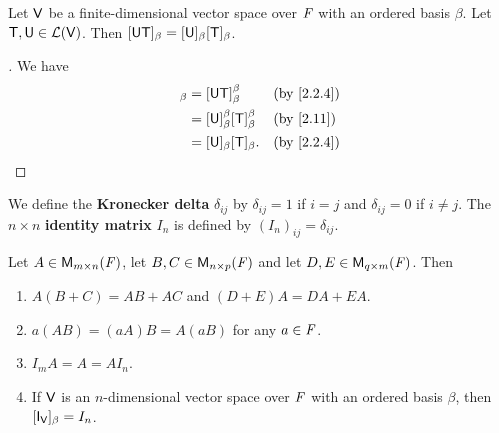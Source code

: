 \begin{cor}\label{2.3.3}
	Let \(\mathsf{V}\) be a finite-dimensional vector space over \(\mathit{F}\) with an ordered basis \(\beta\).
	Let \(\mathsf{T}, \mathsf{U} \in \mathcal{L}(\mathsf{V})\).
	Then \([\mathsf{U} \mathsf{T}]_{\beta} = [\mathsf{U}]_{\beta} [\mathsf{T}]_{\beta}\).
\end{cor}

\begin{proof}[]
	We have
	\begin{align*}
		[\U \T]_{\beta} & = [\U \T]_{\beta}^{\beta}                   &  & \by{2.2.4} \\
		                & = [\U]_{\beta}^{\beta} [\T]_{\beta}^{\beta} &  & \by{2.11}  \\
		                & = [\U]_{\beta} [\T]_{\beta}.                &  & \by{2.2.4}
	\end{align*}
\end{proof}

\begin{defn}\label{2.3.4}
	We define the \textbf{Kronecker delta} \(\delta_{i j}\) by \(\delta_{i j} = 1\) if \(i = j\) and \(\delta_{i j} = 0\) if \(i \neq j\).
	The \(n \times n\) \textbf{identity matrix} \(I_n\) is defined by \((I_n)_{i j} = \delta_{i j}\).
\end{defn}

\begin{thm}\label{2.12}
	Let \(A \in \mathsf{M}_{{m} \times n}({\mathit{F}})\), let \(B, C \in \mathsf{M}_{{n} \times p}({\mathit{F}})\) and let \(D, E \in \mathsf{M}_{{q} \times m}({\mathit{F}})\).
	Then
	\begin{enumerate}
		\item \(A (B + C) = AB + AC\) and \((D + E) A = DA + EA\).
		\item \(a (AB) = (aA) B = A (aB)\) for any \(a \in \mathit{F}\).
		\item \(I_m A = A = A I_n\).
		\item If \(\mathsf{V}\) is an \(n\)-dimensional vector space over \(\mathit{F}\) with an ordered basis \(\beta\), then \([\IT[\V]]_{\beta} = I_n\).
	\end{enumerate}
\end{thm}

